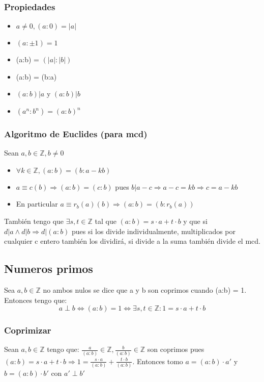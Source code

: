 \documentclass{article}
\begin{document}
\subsubsection{Propiedades}
\begin{itemize}
    \item $a \neq 0, (a:0) = |a|$
    \item $(a:\pm 1) = 1$
    \item (a:b) = $(|a|:|b|)$
    \item (a:b) = (b:a)
    \item $(a:b)|a$ y $(a:b)|b$
    \item $(a^n:b^n) = (a:b)^n$
\end{itemize}

\subsubsection{Algoritmo de Euclides (para mcd)}
Sean $a,b \in \mathbb{Z}, b \neq 0$
\begin{itemize}
    \item $\forall k \in \mathbb{Z}, (a:b) = (b:a-kb)$
    \item $a \equiv c (b) \Rightarrow (a:b) = (c:b)$ pues $b|a-c \Rightarrow a-c = kb \Rightarrow c = a-kb$
    \item En particular $a \equiv r_b(a) (b) \Rightarrow (a:b) = (b:r_b(a))$    
\end{itemize}
También tengo que $\exists s,t \in \mathbb{Z}$ tal que $(a:b) = s\cdot a +t\cdot b$ y que si $d|a \land d|b \Rightarrow d|(a:b)$ pues si los divide individualmente, multiplicados por cualquier c entero también los dividirá, si divide a la suma también divide el mcd.

\subsection{Numeros primos}
Sea $a,b \in \mathbb{Z}$ no ambos nulos se dice que a y b son coprimos cuando (a:b) = 1. Entonces tengo que: \begin{equation}
    a \perp b \iff (a:b) = 1 \iff \exists s,t \in \mathbb{Z}: 1 = s \cdot a + t \cdot b
\end{equation}
\subsubsection{Coprimizar}
Sean $a,b \in \mathbb{Z}$ tengo que:
$\frac{a}{(a:b)} \in \mathbb{Z}, \frac{b}{(a:b)} \in \mathbb{Z}$ son coprimos pues $(a:b) = s \cdot a + t \cdot b \Rightarrow 1 = \frac{s \cdot a}{(a:b)} + \frac{t \cdot b}{(a:b)}$. Entonces tomo $a = (a:b) \cdot a'$ y $b = (a:b) \cdot b'$ con $a' \perp b'$
\end{document}
